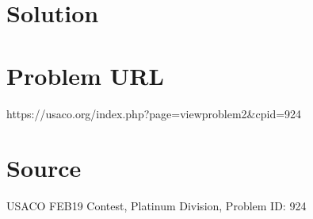 \documentclass[12pt]{article}
\begin{document}
\section*{Solution}


\section*{Problem URL}
https://usaco.org/index.php?page=viewproblem2&cpid=924

\section*{Source}
USACO FEB19 Contest, Platinum Division, Problem ID: 924
\end{document}
